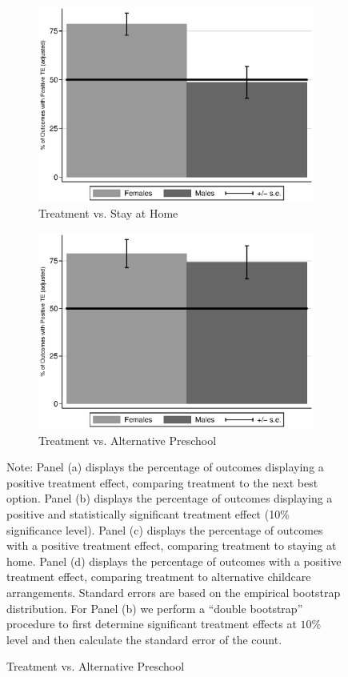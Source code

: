 \begin{figure}
\begin{subfigure}[h]{0.4\textwidth}
		\caption{ Treatment vs. Stay at Home} \label{fig:ppositivehome}
		\includegraphics[width=\textwidth]{output/epan_ipw_p0_all.eps}
\end{subfigure}%
\begin{subfigure}[h]{0.4\textwidth}
	\centering
	\caption{Treatment vs. Alternative Preschool} \label{fig:ppositivealternative}
		\includegraphics[width=\textwidth]{output/epan_ipw_p1_all.eps}
\end{subfigure}
\scriptsize \justify
Note: Panel (a) displays the percentage of outcomes displaying a positive treatment effect, comparing treatment to the next best option. Panel (b) displays the percentage of outcomes displaying a positive and statistically significant treatment effect (10\% significance level). Panel (c) displays the percentage of outcomes with a positive treatment effect, comparing treatment to staying at home. Panel (d) displays the percentage of outcomes with a positive treatment effect, comparing treatment to alternative childcare arrangements. Standard errors are based on the empirical bootstrap distribution. For Panel (b) we perform a ``double bootstrap'' procedure to first determine significant treatment effects at $10\%$ level and then calculate the standard error of the count.\\
\end{figure}


